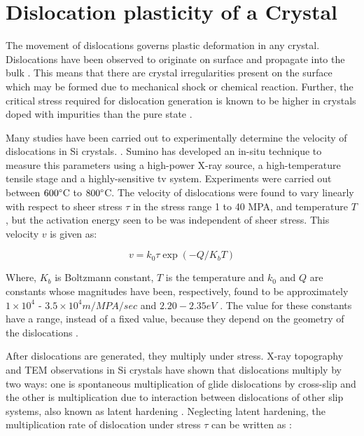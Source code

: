 \section{Dislocation plasticity of a Crystal}
The movement of dislocations governs plastic deformation in any crystal. Dislocations have been observed to originate on surface and propagate into the bulk \cite{tachikawa1990dislocation}. This means that there are crystal irregularities present on the surface which may be formed due to mechanical shock or chemical reaction. Further, the critical stress required for dislocation generation is known to be higher in crystals doped with impurities than the pure state \cite{sumino1999deformation}. 

Many studies have been carried out to experimentally determine the velocity of dislocations in Si crystals. \cite{patel1976electronic,george1972velocities,erofeev1969effect}. Sumino \cite{mizera1987proceedings} has developed an in-situ technique to measure this parameters using a high-power X-ray source, a high-temperature tensile stage and a highly-sensitive tv system. Experiments were carried out between $600\degree$C to $800\degree$C. The velocity of dislocations were found to vary linearly with respect to sheer stress $\tau$ in the stress range 1 to 40 MPA, and temperature $T$, but the activation energy seen to be was independent of sheer stress. This velocity $v$ is given as:

\begin{equation}
   v = k_{0} \tau \exp{(-Q/K_{b}T)}\label{disl_velocity}
\end{equation}

Where, $K_{b}$ is Boltzmann constant, $T$ is the temperature and $k_{0}$ and $Q$ are constants whose magnitudes have been, respectively, found to be approximately $1 \times10^{4}$ - $3.5 \times 10^{4} m/MPA/ sec$ and $2.20 - 2.35 eV$ \cite{imai1983situ}. The value for these constants have a range, instead of a fixed value, because they depend on the geometry of the dislocations \cite{}. 

After dislocations are generated, they multiply under stress. X-ray topography \cite{sumino1981situ} and TEM \cite{sato1977situ} observations in Si crystals have shown that dislocations multiply by two ways: one is spontaneous multiplication of glide dislocations by cross-slip and the other is multiplication due to interaction between dislocations of other slip systems, also known as latent hardening \cite{franciosi1985concepts}. Neglecting latent hardening, the multiplication rate of dislocation under stress $\tau$ can be written as \cite{peissker1962anisotropic}:

